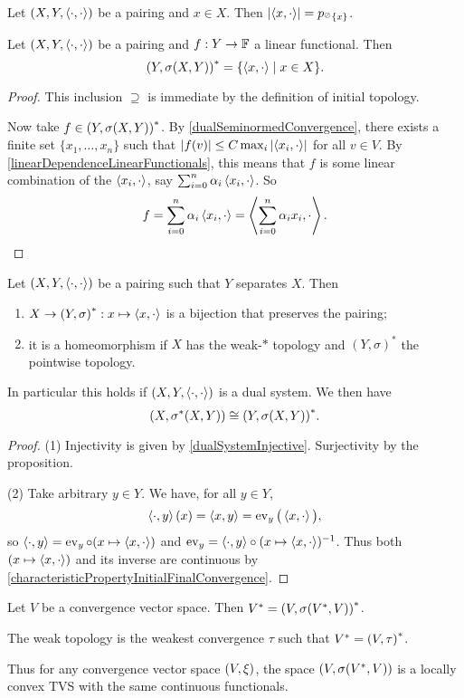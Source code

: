 \begin{lemma}
Let $(X,Y,\left\langle \cdot,\cdot \right\rangle)$ be a pairing and $x\in X$. Then $\left|\left\langle x,\cdot \right\rangle\right| = p_{^\oslash\{x\}}$.
\end{lemma}

\begin{proposition} \label{functionalContinuityWeakTopology}
Let $\sSet{X,Y,\pair{\cdot,\cdot}}$ be a pairing and $f: Y\to \mathbb{F}$ a linear functional. Then
\[ \dual{(Y,\sigma(X,Y))} = \setbuilder{\pair{x,\cdot}}{x\in X}. \]
\end{proposition}
\begin{proof}
This inclusion $\supseteq$ is immediate by the definition of initial topology.

Now take $f\in {(Y,\sigma(X,Y))}^*$. By \ref{dualSeminormedConvergence}, there exists a finite set $\{x_1, \ldots, x_n\}$ such that $|f(v)| \leq C\max_{i}\left|\left\langle x_i, \cdot \right\rangle\right|$ for all $v\in V$. By \ref{linearDependenceLinearFunctionals}, this means that $f$ is some linear combination of the $\left\langle x_i,\cdot \right\rangle$, say $\sum_{i=0}^n \alpha_i \left\langle x_i, \cdot \right\rangle$. So
\[ f = \sum_{i=0}^n \alpha_i \left\langle x_i, \cdot \right\rangle = \left\langle \sum_{i=0}^n \alpha_i x_i, \cdot \right\rangle. \]
\end{proof}
\begin{corollary} \label{dualSystemBijection}
Let $\sSet{X,Y,\pair{\cdot,\cdot}}$ be a pairing such that $Y$ separates $X$. Then
\begin{enumerate}
\item $X\to \sSet{Y, \sigma}^*: x\mapsto \pair{x,\cdot}$ is a bijection that preserves the pairing;
\item it is a homeomorphism if $X$ has the weak-$*$ topology and $(Y,\sigma)^*$ the pointwise topology.
\end{enumerate} 
\end{corollary}
In particular this holds if $\sSet{X,Y,\pair{\cdot,\cdot}}$ is a dual system. We then have
\[ \sSet{X,\sigma^*(X,Y)} \cong \dual{\sSet{Y,\sigma(X,Y)}}. \]
\begin{proof}
(1) Injectivity is given by \ref{dualSystemInjective}. Surjectivity by the proposition.

(2) Take arbitrary $y\in Y$. We have, for all $y\in Y$,
\[ \left\langle \cdot, y \right\rangle(x) = \left\langle x,y \right\rangle = \operatorname{ev}_y\big(\left\langle x, \cdot \right\rangle\big), \]
so $\left\langle \cdot, y \right\rangle = \operatorname{ev}_y \circ (x\mapsto \left\langle x,\cdot \right\rangle)$ and $\operatorname{ev}_y = \left\langle \cdot, y \right\rangle \circ (x\mapsto \left\langle x,\cdot \right\rangle)^{-1}$. Thus both $(x\mapsto \left\langle x,\cdot \right\rangle)$ and its inverse are continuous by \ref{characteristicPropertyInitialFinalConvergence}.
\end{proof}
\begin{corollary} \label{weakestConvergenceOfTheDualPair}
Let $V$ be a convergence vector space. Then $V^* = \sSet{V, \sigma(V^*, V)}^*$.

The weak topology is the weakest convergence $\tau$ such that $V^* = \sSet{V, \tau}^*$.
\end{corollary}
Thus for any convergence vector space $\sSet{V,\xi}$, the space $\sSet{V, \sigma(V^*, V)}$ is a locally convex TVS with the same continuous functionals.

